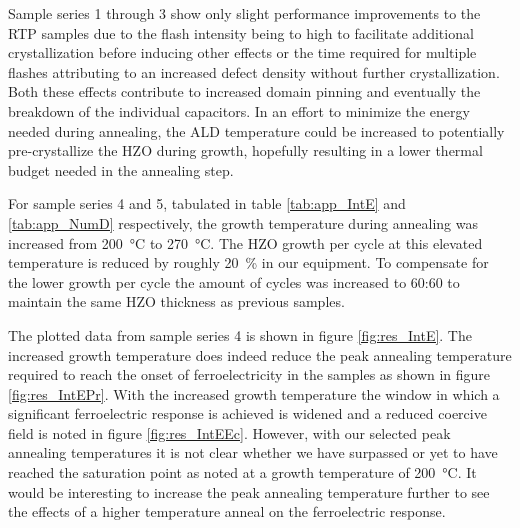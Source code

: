 \documentclass[11pt,twoside]{eitExjobb}
\begin{document}
Sample series 1 through 3 show only slight performance improvements to the RTP
samples due to the flash intensity being to high to facilitate additional
crystallization before inducing other effects or the time required for multiple
flashes attributing to an increased defect density without further
crystallization. Both these effects contribute to increased domain pinning and
eventually the breakdown of the individual capacitors. In an effort to minimize the
energy needed during annealing, the ALD temperature could be increased to
potentially pre-crystallize the HZO during growth, hopefully resulting in a
lower thermal budget needed in the annealing step.

For sample series 4 and 5, tabulated in table \ref{tab:app_IntE} and
\ref{tab:app_NumD} respectively, the growth temperature during annealing was
increased from \SI{200}{\celsius} to \SI{270}{\celsius}. The HZO growth per
cycle at this elevated temperature is reduced by roughly \SI{20}{\percent} in
our equipment. To compensate for the lower growth per cycle the amount of cycles
was increased to 60:60 to maintain the same HZO thickness as previous samples.

The plotted data from sample series 4 is shown in figure \ref{fig:res_IntE}. The
increased growth temperature does indeed reduce the peak annealing temperature
required to reach the onset of ferroelectricity in the samples as shown in
figure \ref{fig:res_IntEPr}. With the increased growth temperature the window in
which a significant ferroelectric response is achieved is widened and a reduced
coercive field is noted in figure \ref{fig:res_IntEEc}. However, with our
selected peak annealing temperatures it is not clear whether we have surpassed
or yet to have reached the saturation point as noted at a growth temperature of
\SI{200}{\celsius}. It would be interesting to increase the peak annealing
temperature further to see the effects of a higher temperature anneal on the
ferroelectric response.
\end{document}
